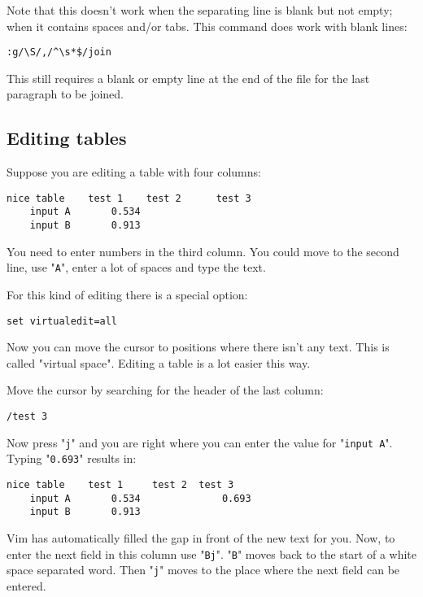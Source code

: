 Note that this doesn't work when the separating line is blank but not empty; when it contains spaces and/or tabs.
This command does work with blank lines:

\begin{Verbatim}[samepage=true]
 :g/\S/,/^\s*$/join
\end{Verbatim}

This still requires a blank or empty line at the end of the file for the last paragraph to be joined.
\subsection{Editing tables}
Suppose you are editing a table with four columns:

\begin{Verbatim}[samepage=true]
    nice table    test 1    test 2      test 3 
    input A       0.534 
    input B       0.913 
\end{Verbatim}

You need to enter numbers in the third column.
You could move to the second line, use "\texttt{A}", enter a lot of spaces and type the text.

For this kind of editing there is a special option:

\begin{Verbatim}[samepage=true]
 set virtualedit=all
\end{Verbatim}

Now you can move the cursor to positions where there isn't any text.
This is called "virtual space".
Editing a table is a lot easier this way.

Move the cursor by searching for the header of the last column:

\begin{Verbatim}[samepage=true]
 /test 3
\end{Verbatim}

Now press "\texttt{j}" and you are right where you can enter the value for "\texttt{input A}".
Typing "\texttt{0.693}" results in:

\begin{Verbatim}[samepage=true]
    nice table    test 1     test 2  test 3 
    input A       0.534              0.693 
    input B       0.913 
\end{Verbatim}

Vim has automatically filled the gap in front of the new text for you.
Now, to enter the next field in this column use "\texttt{Bj}".
"\texttt{B}" moves back to the start of a white space separated word.
Then "\texttt{j}" moves to the place where the next field can be entered.

